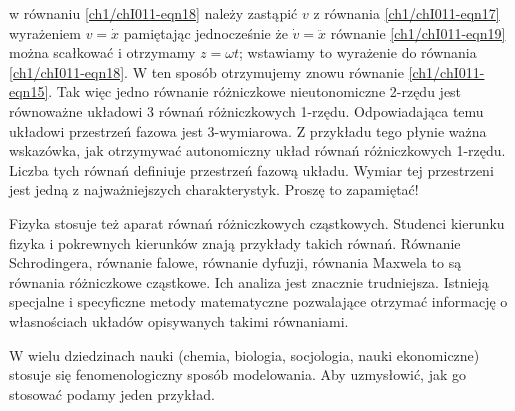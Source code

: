 \documentclass[a4paper,12pt,polish]{sphinxmanual}
\begin{document}
w równaniu  \eqref{ch1/chI011-eqn18}  należy zastąpić $v$   z równania \eqref{ch1/chI011-eqn17} wyrażeniem   $v=\dot x$ pamiętając jednocześnie że $\dot v = \ddot x$
równanie \eqref{ch1/chI011-eqn19} można scałkować i otrzymamy $z=\omega t$; wstawiamy to wyrażenie do równania \eqref{ch1/chI011-eqn18}.
W ten sposób otrzymujemy znowu równanie \eqref{ch1/chI011-eqn15}. Tak więc jedno równanie różniczkowe nieutonomiczne 2-rzędu jest równoważne układowi 3 równań różniczkowych 1-rzędu. Odpowiadająca temu układowi przestrzeń fazowa jest 3-wymiarowa.  Z przykładu tego płynie ważna wskazówka, jak otrzymywać autonomiczny układ równań różniczkowych 1-rzędu. Liczba tych równań definiuje przestrzeń fazową układu. Wymiar tej przestrzeni jest jedną z najważniejszych charakterystyk. Proszę to zapamiętać!

Fizyka stosuje też aparat równań różniczkowych cząstkowych. Studenci kierunku fizyka i pokrewnych kierunków znają przykłady takich równań. Równanie Schrodingera, równanie falowe, równanie dyfuzji, równania Maxwela to są równania różniczkowe cząstkowe. Ich analiza jest znacznie trudniejsza. Istnieją specjalne i specyficzne  metody matematyczne pozwalające otrzymać informację o własnościach układów opisywanych takimi równaniami.

W wielu dziedzinach nauki (chemia, biologia, socjologia, nauki ekonomiczne) stosuje się fenomenologiczny sposób modelowania.  Aby uzmysłowić, jak go stosować podamy jeden przykład.
\end{document}
